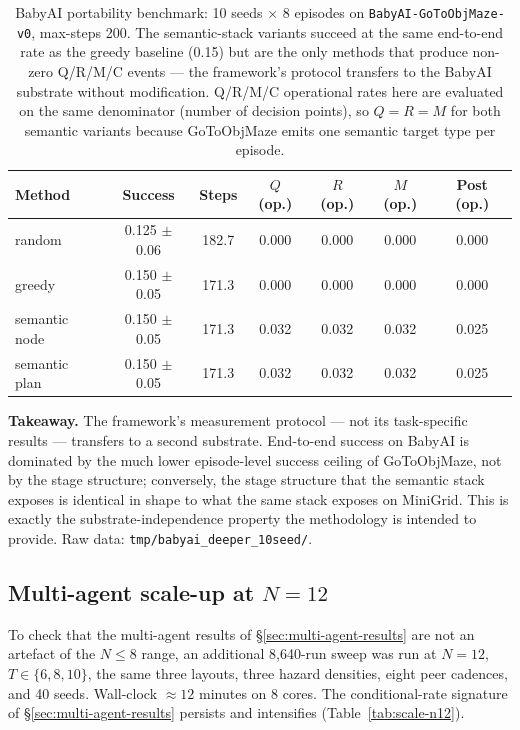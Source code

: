 \documentclass{article}
\begin{document}
\begin{table}[h]
\centering
\caption{BabyAI portability benchmark: 10 seeds $\times$ 8 episodes on \texttt{BabyAI-GoToObjMaze-v0}, max-steps 200. The semantic-stack variants succeed at the same end-to-end rate as the greedy baseline (0.15) but are the only methods that produce non-zero Q/R/M/C events --- the framework's protocol transfers to the BabyAI substrate without modification. Q/R/M/C operational rates here are evaluated on the same denominator (number of decision points), so $Q{=}R{=}M$ for both semantic variants because GoToObjMaze emits one semantic target type per episode.}
\label{tab:babyai-deeper}
\small
\begin{tabular}{l c c c c c c}
\toprule
Method & Success & Steps & $Q$ (op.) & $R$ (op.) & $M$ (op.) & Post (op.) \\
\midrule
random         & 0.125 $\pm$ 0.06 & 182.7 & 0.000 & 0.000 & 0.000 & 0.000 \\
greedy         & 0.150 $\pm$ 0.05 & 171.3 & 0.000 & 0.000 & 0.000 & 0.000 \\
semantic node  & 0.150 $\pm$ 0.05 & 171.3 & 0.032 & 0.032 & 0.032 & 0.025 \\
semantic plan  & 0.150 $\pm$ 0.05 & 171.3 & 0.032 & 0.032 & 0.032 & 0.025 \\
\bottomrule
\end{tabular}
\end{table}

\textbf{Takeaway.} The framework's measurement protocol --- not its task-specific results --- transfers to a second substrate. End-to-end success on BabyAI is dominated by the much lower episode-level success ceiling of GoToObjMaze, not by the stage structure; conversely, the stage structure that the semantic stack exposes is identical in shape to what the same stack exposes on MiniGrid. This is exactly the substrate-independence property the methodology is intended to provide. Raw data: \texttt{tmp/babyai\_deeper\_10seed/}.

\subsection{Multi-agent scale-up at $N=12$}
\label{app:scale-N12}

To check that the multi-agent results of \S\ref{sec:multi-agent-results} are not an artefact of the $N\!\le\!8$ range, an additional 8{,}640-run sweep was run at $N\!=\!12$, $T \in \{6, 8, 10\}$, the same three layouts, three hazard densities, eight peer cadences, and 40 seeds. Wall-clock $\approx 12$ minutes on 8 cores. The conditional-rate signature of \S\ref{sec:multi-agent-results} persists and intensifies (Table~\ref{tab:scale-n12}).
\end{document}
